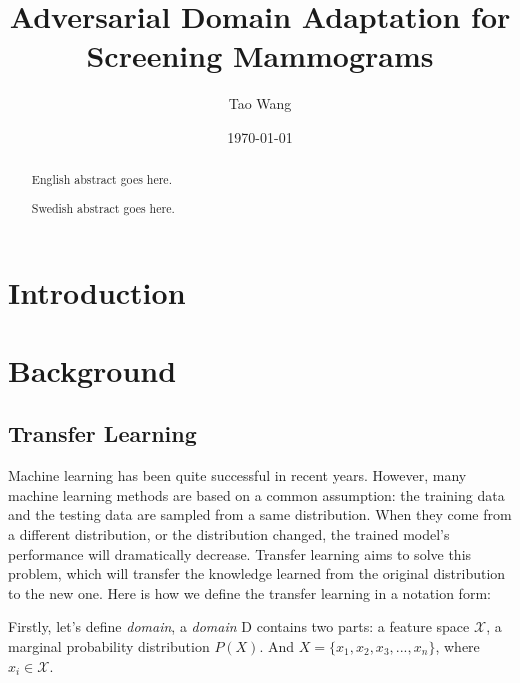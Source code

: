 \documentclass{kththesis}
\title{Adversarial Domain Adaptation for Screening Mammograms}
\author{Tao Wang}
\date{\today}
\begin{document}
\frontmatter

\titlepage

\begin{abstract}
  English abstract goes here.

\end{abstract}


\begin{otherlanguage}{swedish}
  \begin{abstract}
    Swedish abstract goes here.
  \end{abstract}
\end{otherlanguage}


\tableofcontents


\mainmatter


\chapter{Introduction}



\chapter{Background}
\section{Transfer Learning}
Machine learning has been quite successful in recent years. However, many machine learning methods are based on a common assumption: the training data and the testing data are sampled from a same distribution. When they come from a different distribution, or the distribution changed, the trained model's performance will dramatically decrease. Transfer learning aims to solve this problem, which will transfer the knowledge learned from the original distribution to the new one. Here is how we define the transfer learning in a notation form\cite{pan2010survey}:

\noindent Firstly, let's define \emph{domain}, a \emph{domain} D contains two parts: a feature space  $\mathcal{X}$, a marginal probability distribution $P(X)$. And $X = \{x_1,x_2,x_3,...,x_n\}$, where $x_i \in \mathcal{X}$. 
\end{document}
